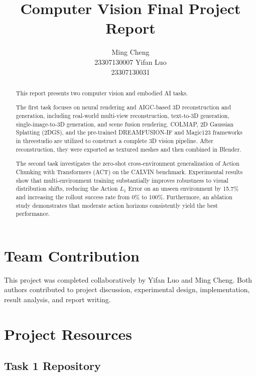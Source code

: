 \documentclass{article}
\title{
    Computer Vision Final Project Report
}
\author{
    Ming Cheng \\
    23307130007
    \And
    Yifan Luo \\
    23307130031
}
\begin{document}
\maketitle

\begin{abstract}
This report presents two computer vision and embodied AI tasks.

The first task focuses on neural rendering and AIGC-based 3D reconstruction and generation, including real-world multi-view reconstruction, text-to-3D generation, single-image-to-3D generation, and scene fusion rendering. COLMAP, 2D Gaussian Splatting (2DGS), and the pre-trained DREAMFUSION-IF and Magic123 frameworks in threestudio are utilized to construct a complete 3D vision pipeline. After reconstruction, they were exported as textured meshes and then combined in Blender.

The second task investigates the zero-shot cross-environment generalization of Action Chunking with Transformers (ACT) on the CALVIN benchmark. Experimental results show that multi-environment training substantially improves robustness to visual distribution shifts, reducing the Action $L_1$ Error on an unseen environment by 15.7\% and increasing the rollout success rate from 0\% to 100\%. Furthermore, an ablation study demonstrates that moderate action horizons consistently yield the best performance.

\end{abstract}

\section*{Team Contribution}

This project was completed collaboratively by Yifan Luo and Ming Cheng. Both authors contributed to project discussion, experimental design, implementation, result analysis, and report writing.







\appendix

\section{Project Resources}

\subsection{Task 1 Repository}
\end{document}
